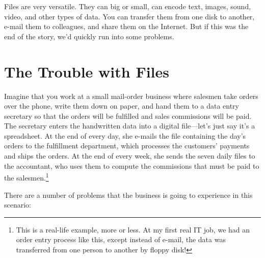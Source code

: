 \documentclass[11pt]{book}
\begin{document}
Files are very versatile.  They can big or small, can encode text, images, sound, video, and other types of data.  You can transfer them from one disk to another, e-mail them to colleagues, and share them on the Internet.  But if this was the end of the story, we'd quickly run into some problems.

\section{The Trouble with Files}\label{sec:fileproblems}

Imagine that you work at a small mail-order business where salesmen take orders over the phone, write them down on paper, and hand them to a data entry secretary so that the orders will be fulfilled and sales commissions will be paid.  The secretary enters the handwritten data into a digital file---let's just say it's a spreadsheet.  At the end of every day, she e-mails the file containing the day's orders to the fulfillment department, which processes the customers' payments and ships the orders.  At the end of every week, she sends the seven daily files to the accountant, who uses them to compute the commissions that must be paid to the salesmen.\footnote{This is a real-life example, more or less. At my first real IT job, we had an order entry process like this, except instead of e-mail, the data was transferred from one person to another by floppy disk!}  

There are a number of problems that the business is going to experience in this scenario:
\end{document}
